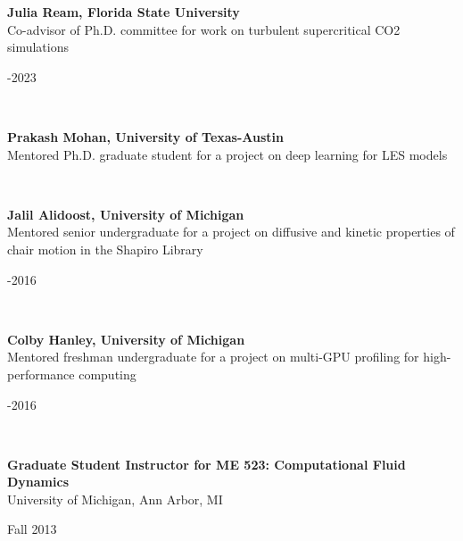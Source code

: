 \documentclass[11pt,letterpaper]{article}
\begin{document}
\begin{minipage}[t]{0.82\textwidth}%
  \textbf{Julia Ream, Florida State University}\\%
  Co-advisor of Ph.D. committee for work on turbulent supercritical CO2 simulations%
\end{minipage}\hfill%
\begin{minipage}[t]{0.15\textwidth}-2023%
\end{minipage}\\[2ex]%
\begin{minipage}[t]{0.82\textwidth}%
  \textbf{Prakash Mohan, University of Texas-Austin}\\%
  Mentored Ph.D. graduate student for a project on deep learning for LES models%
\end{minipage}\hfill%
\begin{minipage}[t]{0.15\textwidth}%
\end{minipage}\\[2ex]%
\begin{minipage}[t]{0.82\textwidth}%
  \textbf{Jalil Alidoost, University of Michigan}\\%
  Mentored senior undergraduate for a project on diffusive and kinetic properties of chair motion in the Shapiro Library%
\end{minipage}\hfill%
\begin{minipage}[t]{0.15\textwidth}-2016%
\end{minipage}\\[2ex]%
\begin{minipage}[t]{0.82\textwidth}%
  \textbf{Colby Hanley, University of Michigan}\\%
  Mentored freshman undergraduate for a project on multi-GPU profiling for high-performance computing%
\end{minipage}\hfill%
\begin{minipage}[t]{0.15\textwidth}-2016%
\end{minipage}\\[2ex]%
\begin{minipage}[t]{0.82\textwidth}%
  \textbf{Graduate Student Instructor for ME 523: Computational Fluid Dynamics}\\%
  University of Michigan, Ann Arbor, MI%
\end{minipage}\hfill%
\begin{minipage}[t]{0.15\textwidth}\flushright%
  Fall 2013%
\end{minipage}\\[3ex]%
\end{document}
